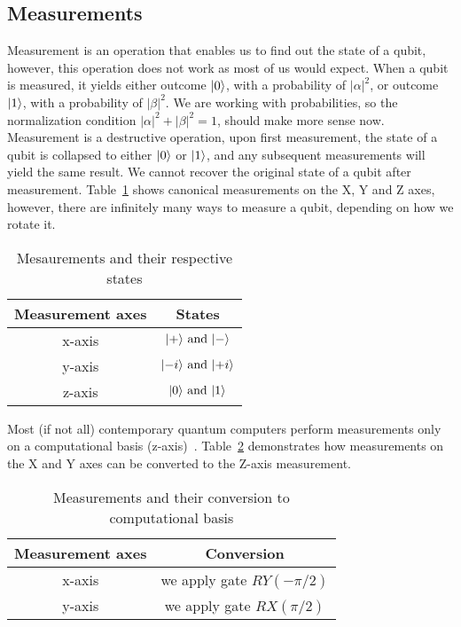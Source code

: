 \subsection*{Measurements}
Measurement is an operation that enables us to find out the state of a qubit, however, this operation does not work as most of us would expect. When a qubit is measured, it yields either outcome $\lvert0\rangle$, with a probability of $\lvert \alpha \rvert^2$, or outcome $\lvert1\rangle$, with a probability of $\lvert \beta \rvert^2$. We are working with probabilities, so the normalization condition $\lvert \alpha \rvert^2 + \lvert \beta \rvert^2 = 1$, should make more sense now. Measurement is a destructive operation, upon first measurement, the state of a qubit is collapsed to either $\lvert0\rangle$ or $\lvert1\rangle$, and any subsequent measurements will yield the same result. We cannot recover the original state of a qubit after measurement. Table~\ref{tab:measurements-states} shows canonical measurements on the X, Y and Z axes, however, there are infinitely many ways to measure a qubit, depending on how we rotate it.

\begin{table}[H]
  \centering
  \begin{tabular}{|c|c|} 
      \hline
      \multicolumn{1}{|c|}{\textbf{Measurement axes}} & \textbf{States}\\
      \hline
      x-axis & $\lvert+\rangle \text{ and }\lvert-\rangle$\\ 
      \hline
      y-axis & $\lvert-i\rangle \text{ and }\lvert+i\rangle$\\ 
      \hline
      z-axis & $\lvert0\rangle \text{ and }\lvert1\rangle$\\ 
      \hline
  \end{tabular}
  \caption{Mesaurements and their respective states}
  \label{tab:measurements-states}
\end{table}
Most (if not all) contemporary quantum computers perform measurements only on a computational basis (z-axis)~\cite{blog}. Table~\ref{tab:measurements-conversion} demonstrates how measurements on the X and Y axes can be converted to the Z-axis measurement.
\begin{table}[H]
  \centering
  \begin{tabular}{|c|c|} 
      \hline
      \multicolumn{1}{|c|}{\textbf{Measurement axes}} & \textbf{Conversion}\\
      \hline
      x-axis & we apply gate $RY(-\pi/2)$ \\ 
      \hline
      y-axis & we apply gate $RX(\pi/2)$ \\ 
      \hline
  \end{tabular}
  \caption{Measurements and their conversion to computational basis}
  \label{tab:measurements-conversion}
\end{table}

